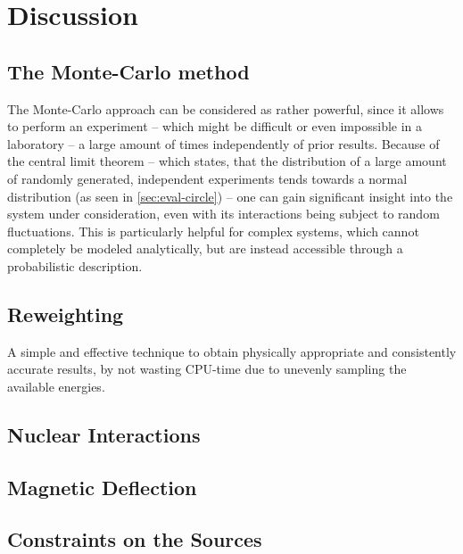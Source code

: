 \section{Discussion}
\subsection{The Monte-Carlo method}
The Monte-Carlo approach can be considered as rather powerful, since it allows
to perform  an experiment -- which might be difficult or even impossible in a
laboratory -- a large amount of times independently of prior results. Because of
the central limit theorem -- which states, that the distribution of a
large amount of randomly generated, independent experiments tends
towards a normal distribution (as seen in \cref{sec:eval-circle}) -- one
can gain significant insight into the system under consideration,
even with its interactions being subject to random fluctuations.
This is particularly helpful for complex systems, which cannot completely be
modeled analytically, but are instead accessible through a probabilistic
description.

\subsection{Reweighting}
A simple and effective technique to obtain physically appropriate and
consistently accurate results, by not wasting CPU-time due to unevenly sampling
the available energies.

\subsection{Nuclear Interactions}


\subsection{Magnetic Deflection}


\subsection{Constraints on the Sources}


